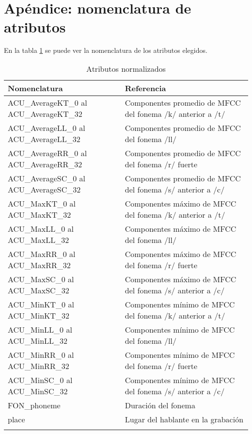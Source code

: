 \chapter*{ {\small Apéndice: nomenclatura de atributos}}

\footnotesize

En la tabla \ref{tab:attr} se puede ver la nomenclatura de los atributos elegidos. 
\centering
\begin{longtable}{| p{} | p{} |} 
\hline
\textbf{Nomenclatura}  & \textbf{Referencia}   \\ \hline
ACU\_AverageKT\_0 al ACU\_AverageKT\_32 & Componentes promedio de MFCC del fonema /k/ anterior a /t/\\ \hline
ACU\_AverageLL\_0 al ACU\_AverageLL\_32 & Componentes promedio de MFCC del fonema /ll/\\ \hline
ACU\_AverageRR\_0 al ACU\_AverageRR\_32 & Componentes promedio de MFCC del fonema /r/ fuerte\\ \hline
ACU\_AverageSC\_0 al ACU\_AverageSC\_32 & Componentes promedio de MFCC del fonema /s/ anterior a /c/\\ \hline
ACU\_MaxKT\_0 al ACU\_MaxKT\_32 & Componentes máximo de MFCC del fonema /k/ anterior a /t/\\ \hline
ACU\_MaxLL\_0 al ACU\_MaxLL\_32 & Componentes máximo de MFCC del fonema /ll/\\ \hline
ACU\_MaxRR\_0 al ACU\_MaxRR\_32 & Componentes máximo de MFCC del fonema /r/ fuerte\\ \hline
ACU\_MaxSC\_0 al ACU\_MaxSC\_32 & Componentes máximo de MFCC del fonema /s/ anterior a /c/\\ \hline
ACU\_MinKT\_0 al ACU\_MinKT\_32 & Componentes mínimo de MFCC del fonema /k/ anterior a /t/\\ \hline
ACU\_MinLL\_0 al ACU\_MinLL\_32 & Componentes mínimo de MFCC del fonema /ll/\\ \hline
ACU\_MinRR\_0 al ACU\_MinRR\_32 & Componentes mínimo de MFCC del fonema /r/ fuerte\\ \hline
ACU\_MinSC\_0 al ACU\_MinSC\_32 & Componentes mínimo de MFCC del fonema /s/ anterior a /c/ \\ \hline
FON\_phoneme & Duración del fonema\\ \hline
place & Lugar del hablante en la grabación\\ \hline
\caption*{Atributos normalizados} 
\label{tab:attr}
\end{longtable}

